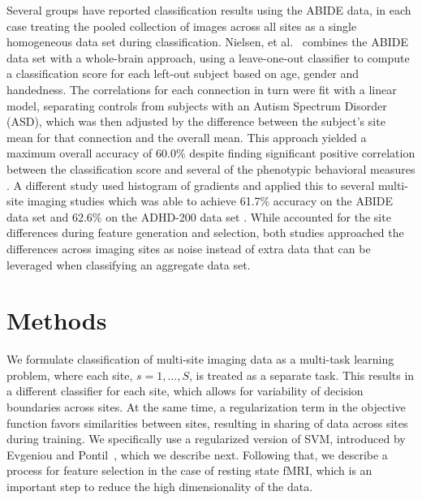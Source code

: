 \documentclass{llncs}
\begin{document}
Several groups have reported classification results using the ABIDE data, in
each case treating the pooled collection of images across all sites as a single
homogeneous data set during classification. Nielsen, et al.~\cite{Jared} combines
the ABIDE data set with a whole-brain approach, using a leave-one-out classifier
to compute a classification score for each left-out subject based on age, gender
and handedness. The correlations for each connection in turn were fit with a
linear model, separating controls from subjects with an Autism Spectrum Disorder (ASD), which was then adjusted by the
difference between the subject's site mean for that connection and the overall
mean. This approach yielded a maximum overall accuracy of 60.0\% despite finding
significant positive correlation between the classification score and several of
the phenotypic behavioral measures \cite{Jared}. A different study used
histogram of gradients and applied this to several multi-site imaging studies
which was able to achieve 61.7\% accuracy on the ABIDE data set and 62.6\% on the
ADHD-200 data set \cite{ghiassian}. While \cite{Jared} accounted for the site
differences during feature generation and selection, both studies approached the
differences across imaging sites as noise instead of extra data that can be
leveraged when classifying an aggregate data set.



\section{Methods}
We formulate classification of multi-site imaging data as a multi-task learning
problem, where each site, $s = 1, \ldots, S$, is treated as a separate
task. This results in a different classifier for each site, which allows for
variability of decision boundaries across sites. At the same time, a regularization
term in the objective function favors similarities between sites, resulting in
sharing of data across sites during training. We specifically use a regularized
version of SVM, introduced by Evgeniou and Pontil~\cite{regMTL}, which we
describe next. Following that, we describe a process for feature selection in
the case of resting state fMRI, which is an important step to reduce the high
dimensionality of the data.
\end{document}
